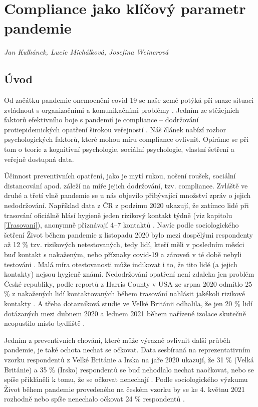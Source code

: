 \chapter{Compliance jako klíčový parametr pandemie}
\label{Compliance}

\textit{Jan Kulhánek, Lucie Michálková, Josefína Weinerová}
\vspace{15mm}

\section*{Úvod} 

Od začátku pandemie onemocnění covid-19 se naše země potýká při snaze situaci zvládnout s organizačními a komunikačními problémy \cite{CeskaTiskovaKancelar2020,Vlckova2020}. Jedním ze stěžejních faktorů efektivního boje s pandemií je compliance -- dodržování protiepidemických opatření širokou veřejností \cite{VanRooij2020}. Náš článek nabízí rozbor psychologických faktorů, které mohou míru compliance ovlivnit. Opíráme se při tom o teorie z kognitivní psychologie, sociální psychologie, vlastní šetření a veřejně dostupná data. 

Účinnost preventivních opatření, jako je mytí rukou, nošení roušek, sociální distancování apod. záleží na míře jejich dodržování, tzv. compliance. Zvláště ve druhé a třetí vlně pandemie se u nás objevilo přibývající množství zpráv o jejich nedodržování. Například data z ČR z podzimu 2020 ukazují, že zatímco lidé při trasování oficiálně hlásí hygieně jeden rizikový kontakt týdně (viz kapitolu \ref{Trasovani}), anonymně přiznávají 4--7 kontaktů \cite{Prokop2020a}. Navíc podle sociologického šetření Život během pandemie z listopadu 2020 bylo mezi dospělými respondenty až 12 \% tzv. rizikových netestovaných, tedy lidí, kteří měli v posledním měsíci buď kontakt s nakaženým, nebo příznaky covid-19 a zároveň v té době nebyli testováni \cite{Prokop2020}. Malá míra otestovanosti může indikovat i to, že tito lidé (a jejich kontakty) nejsou hygieně známi. Nedodržování opatření není zdaleka jen problém České republiky, podle reportů z Harris County v USA ze srpna 2020 odmítlo 25 \% z nakažených lidí kontaktovaných během trasování nahlásit jakékoli rizikové kontakty \cite{Shapiro2020}. A třeba dotazníková studie ve Velké Británii odhalila, že jen 20 \% lidí dotázaných mezi dubnem 2020 a lednem 2021 během nařízené izolace skutečně neopustilo místo bydliště \cite{Smith2021}.

Jedním z preventivních chování, které může výrazně ovlivnit další průběh pandemie, je také ochota nechat se očkovat. Data sesbíraná na reprezentativním vzorku respondentů z Velké Británie a Irska na jaře 2020 ukazují, že 31 \% (Velká Británie) a 35 \% (Irsko) respondentů se buď nehodlalo nechat naočkovat, nebo se spíše přikláněli k tomu, že se očkovat nenechají \cite{Murphy2021}. Podle sociologického výzkumu Život během pandemie provedeného na českém vzorku by se ke 4. květnu 2021 rozhodně nebo spíše nenechalo očkovat 24 \% respondentů \cite{Prokop2021}.

